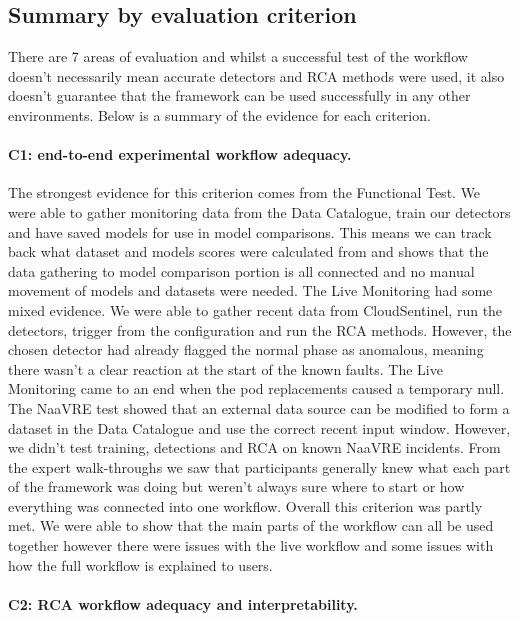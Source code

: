 \subsection{Summary by evaluation criterion}

There are 7 areas of evaluation and whilst a successful test of the workflow doesn’t necessarily mean accurate detectors and RCA methods were used, it also doesn’t guarantee that the framework can be used successfully in any other environments. Below is a summary of the evidence for each criterion.

\paragraph{C1: end-to-end experimental workflow adequacy.}

The strongest evidence for this criterion comes from the Functional Test. We were able to gather monitoring data from the Data Catalogue, train our detectors and have saved models for use in model comparisons. This means we can track back what dataset and models scores were calculated from and shows that the data gathering to model comparison portion is all connected and no manual movement of models and datasets were needed. The Live Monitoring had some mixed evidence. We were able to gather recent data from CloudSentinel, run the detectors, trigger from the configuration and run the RCA methods. However, the chosen detector had already flagged the normal phase as anomalous, meaning there wasn’t a clear reaction at the start of the known faults. The Live Monitoring came to an end when the pod replacements caused a temporary null. The NaaVRE test showed that an external data source can be modified to form a dataset in the Data Catalogue and use the correct recent input window. However, we didn’t test training, detections and RCA on known NaaVRE incidents. From the expert walk-throughs we saw that participants generally knew what each part of the framework was doing but weren’t always sure where to start or how everything was connected into one workflow. Overall this criterion was partly met. We were able to show that the main parts of the workflow can all be used together however there were issues with the live workflow and some issues with how the full workflow is explained to users.

\paragraph{C2: RCA workflow adequacy and interpretability.}

